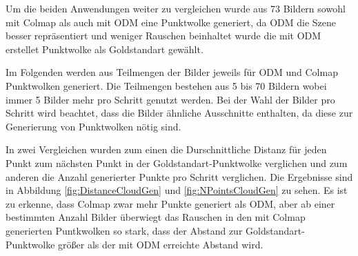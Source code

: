 \documentclass[12pt,titlepage, twoside]{article}
\begin{document}
Um die beiden Anwendungen weiter zu vergleichen wurde aus 73 Bildern sowohl mit Colmap als auch mit ODM eine Punktwolke generiert, 
da ODM die Szene besser repräsentiert und weniger Rauschen beinhaltet wurde die mit ODM erstellet Punktwolke als Goldstandart gewählt. 

Im Folgenden werden aus Teilmengen der Bilder jeweils für ODM und Colmap Punktwolken generiert. Die Teilmengen bestehen aus 5 bis 70 Bildern wobei immer 5 Bilder mehr pro Schritt genutzt werden.
Bei der Wahl der Bilder pro Schritt wird beachtet, dass die Bilder ähnliche Ausschnitte enthalten, da diese zur Generierung von Punktwolken nötig sind.

In zwei Vergleichen wurden zum einen die Durschnittliche Distanz für jeden Punkt zum nächsten Punkt in der Goldstandart-Punktwolke verglichen und zum anderen die Anzahl generierter Punkte pro Schritt verglichen.
Die Ergebnisse sind in Abbildung \ref{fig:DistanceCloudGen} und \ref{fig:NPointsCloudGen} zu sehen. 
Es ist zu erkenne, dass Colmap zwar mehr Punkte generiert als ODM, aber ab einer bestimmten Anzahl Bilder überwiegt das Rauschen in den mit Colmap generierten Puntkwolken so stark, dass der Abstand zur Goldstandart-Punktwolke größer als der mit ODM erreichte Abstand wird.
\end{document}
